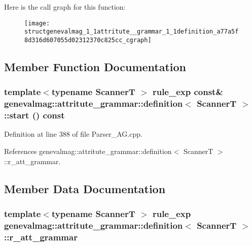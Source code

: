 Here is the call graph for this function:\nopagebreak
\begin{figure}[H]
\begin{center}
\leavevmode
\texttt{[image: structgenevalmag\_1\_1attritute\_\_grammar\_1\_1definition\_a77a5f8d316d607055d02312370c825cc\_cgraph]}
\end{center}
\end{figure}




\subsection{Member Function Documentation}
\hypertarget{structgenevalmag_1_1attritute__grammar_1_1definition_af3478aad9726ea5ca5502c847beff9ea}{
\subsubsection[{start}]{\setlength{\rightskip}{0pt plus 5cm}template$<$typename ScannerT $>$ {\bf rule\_\-exp} const\& {\bf genevalmag::attritute\_\-grammar::definition}$<$ ScannerT $>$::start () const}}
\label{structgenevalmag_1_1attritute__grammar_1_1definition_af3478aad9726ea5ca5502c847beff9ea}


Definition at line 388 of file Parser\_\-AG.cpp.



References genevalmag::attritute\_\-grammar::definition$<$ ScannerT $>$::r\_\-att\_\-grammar.



\subsection{Member Data Documentation}
\hypertarget{structgenevalmag_1_1attritute__grammar_1_1definition_a19dd364d3c6344d537f156ef42700d55}{
\subsubsection[{r\_\-att\_\-grammar}]{\setlength{\rightskip}{0pt plus 5cm}template$<$typename ScannerT $>$ {\bf rule\_\-exp} {\bf genevalmag::attritute\_\-grammar::definition}$<$ ScannerT $>$::{\bf r\_\-att\_\-grammar}}}
\label{structgenevalmag_1_1attritute__grammar_1_1definition_a19dd364d3c6344d537f156ef42700d55}


